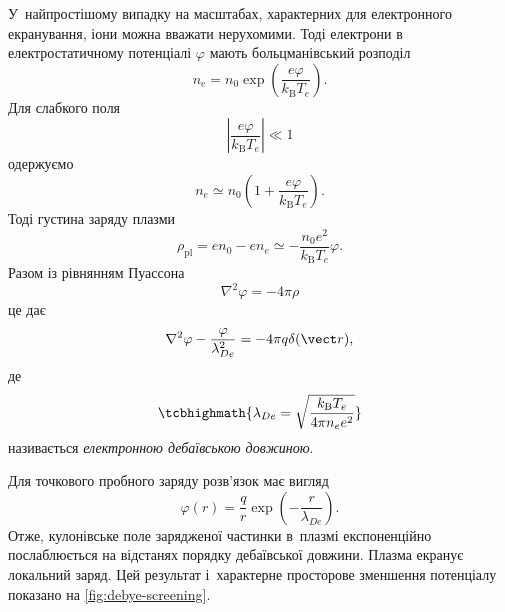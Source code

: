 У~найпростішому випадку на масштабах, характерних для електронного екранування, іони можна вважати нерухомими. Тоді електрони в електростатичному потенціалі $\varphi$ мають больцманівський розподіл
\begin{equation}
	n_e=n_0\exp\left(\frac{e\varphi}{k_{\mathrm B}T_e}\right).
\end{equation}
Для слабкого поля
\begin{equation*}
	\left|\frac{e\varphi}{k_{\mathrm B}T_e}\right|\ll1
\end{equation*}
одержуємо
\begin{equation}
	n_e\simeq n_0
	\left(1+\frac{e\varphi}{k_{\mathrm B}T_e}\right).
\end{equation}
Тоді густина заряду плазми
\begin{equation}
	\rho_{\mathrm{pl}}
	=e n_0-e n_e
	\simeq-\frac{n_0e^2}{k_{\mathrm B}T_e}\varphi.
\end{equation}
Разом із рівнянням Пуассона
\begin{equation}
	\nabla^2\varphi=-4\pi\rho
\end{equation}
це дає
\begin{equation}
	\nabla^2\varphi-\frac{\varphi}{\lambda_{De}^2}
	=-4\pi q\delta(\vect r),
\end{equation}
де
\begin{equation}
	\tcbhighmath{\lambda_{De}
		=\sqrt{\frac{k_{\mathrm B}T_e}{4\pi n_e e^2}}}
\end{equation}
називається \emph{електронною дебаївською довжиною}.

Для точкового пробного заряду розв'язок має вигляд
\begin{equation}
	\varphi(r)
	=\frac{q}{r}
	\exp\left(-\frac{r}{\lambda_{De}}\right).
\end{equation}
Отже, кулонівське поле зарядженої частинки в~плазмі експоненційно послаблюється на відстанях порядку дебаївської довжини. Плазма екранує локальний заряд. Цей результат і~характерне просторове зменшення потенціалу показано на \ref{fig:debye-screening}.

